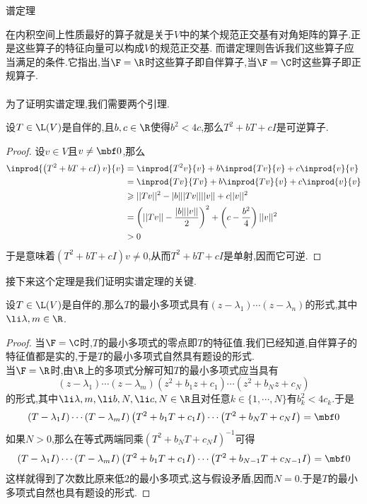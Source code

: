 \documentclass{ctexart}
\begin{document}
\pagestyle{empty}
\begin{center}\large 谱定理\end{center}
在内积空间上性质最好的算子就是关于$V$中的某个规范正交基有对角矩阵的算子.正是这些算子的特征向量可以构成$V$的规范正交基.%
而谱定理则告诉我们这些算子应当满足的条件.它指出,当$\F=\R$时这些算子即自伴算子,当$\F=\C$时这些算子即正规算子.\\
\\
为了证明实谱定理,我们需要两个引理.
\begin{formal}[1.1 可逆二次表达式]
    设$T\in\L(V)$是自伴的,且$b,c\in\R$使得$b^2<4c$,那么$T^2+bT+cI$是可逆算子.
\end{formal}
\begin{proof}
    设$v\in V$且$v\neq\mbf0$,那么
    \[\begin{aligned}
        \inprod{\left(T^2+bT+cI\right)v}{v}
        &= \inprod{T^2v}{v}+b\inprod{Tv}{v}+c\inprod{v}{v} \\
        &= \inprod{Tv}{Tv}+b\inprod{Tv}{v}+c\inprod{v}{v} \\
        &\geqslant ||Tv||^2-|b|||Tv||||v||+c||v||^2 \\
        &= \left(||Tv||-\dfrac{|b|||v||}{2}\right)^2+\left(c-\dfrac{b^2}{4}\right)||v||^2 \\
        &> 0
    \end{aligned}\]
    于是意味着$\left(T^2+bT+cI\right)v\neq0$,从而$T^2+bT+cI$是单射,因而它可逆.
\end{proof}\noindent
接下来这个定理是我们证明实谱定理的关键.
\begin{formal}[1.2 自伴算子的最小多项式]
    设$T\in\L(V)$是自伴的,那么$T$的最小多项式具有$\left(z-\lambda_1\right)\cdots\left(z-\lambda_n\right)$的形式,其中$\li\lambda,m\in\R$.
\end{formal}
\begin{proof}
    当$\F=\C$时,$T$的最小多项式的零点即$T$的特征值.我们已经知道,自伴算子的特征值都是实的,于是$T$的最小多项式自然具有题设的形式.\\
    当$\F=\R$时,由$\R$上的多项式分解可知$T$的最小多项式应当具有
    \[\left(z-\lambda_1\right)\cdots\left(z-\lambda_m\right)\left(z^2+b_1z+c_1\right)\cdots\left(z^2+b_Nz+c_N\right)\]
    的形式,其中$\li\lambda,m,\li b,N,\li c,N\in\R$且对任意$k\in\{1,\cdots,N\}$有$b_k^2<4c_k$.于是
    \[\left(T-\lambda_1I\right)\cdots\left(T-\lambda_mI\right)\left(T^2+b_1T+c_1I\right)\cdots\left(T^2+b_NT+c_NI\right)=\mbf0\]
    如果$N>0$,那么在等式两端同乘$\left(T^2+b_NT+c_NI\right)^{-1}$可得
    \[\left(T-\lambda_1I\right)\cdots\left(T-\lambda_mI\right)\left(T^2+b_1T+c_1I\right)\cdots\left(T^2+b_{N-1}T+c_{N-1}I\right)=\mbf0\]
    这样就得到了次数比原来低$2$的最小多项式,这与假设矛盾,因而$N=0$.于是$T$的最小多项式自然也具有题设的形式.
\end{proof}\noindent
\end{document}
